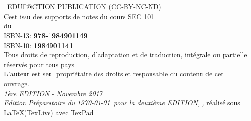 


\newpage

~\vfill
\thispagestyle{empty}

\INFOGitHubS

\noindent {\Huge\ccbyncndeu}\\ 

\noindent \the\year~EDUF@CTION PUBLICATION \href{https://creativecommons.org/licenses/by-nc-nd/2.0/fr/}{(CC-BY-NC-ND)}\\ %

\noindent C\edoc est issu des supports de notes du cours SEC 101\\ 
du \uCnam \\



\noindent ISBN-13: \textbf{978-1984901149}\\
\noindent ISBN-10: \textbf{1984901141} \\



\noindent Tous droits de reproduction, d’adaptation et de traduction, intégrale ou partielle réservés pour tous pays.\\

\noindent L’auteur est seul propriétaire des droits et responsable du contenu de cet ouvrage.\\

\noindent \textit{1ère EDITION - Novembre 2017} \\

\noindent \textit{Edition Préparatoire du \today~pour la deuxième EDITION,  \printer, } réalisé sous \LaTeX (TexLive) avec TexPad \faApple


